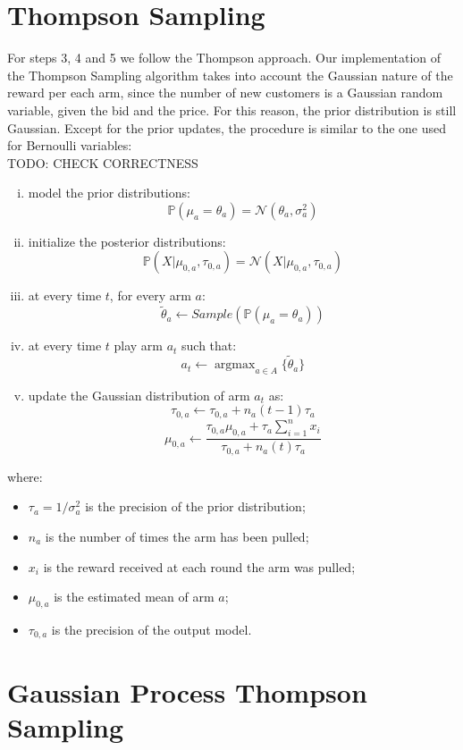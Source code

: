 \documentclass[12pt,a4paper]{report}
\DeclareMathOperator*{\argmax}{argmax}
\begin{document}
		\section{Thompson Sampling}
For steps 3, 4 and 5 we follow the Thompson approach.
Our implementation of the Thompson Sampling algorithm takes into account the Gaussian nature of the reward per each arm, since the number of new customers is a Gaussian random variable, given the bid and the price. For this reason, the prior distribution is still Gaussian. 
Except for the prior updates, the procedure is similar to the one used for Bernoulli variables:
\\TODO: CHECK CORRECTNESS
\begin{enumerate}[i)]
	\item model the prior distributions: $$\mathbb{P}(\mu_a = \theta_a) = \mathcal{N}(\theta_a, \sigma^2_a)$$
	\item initialize the posterior distributions: $$\mathbb{P}(X|\mu_{0,a}, \tau_{0,a}) = \mathcal{N}(X|\mu_{0,a}, \tau_{0,a}) $$
	\item at every time $t$, for every arm $a$:
\[ \tilde \theta_a \leftarrow Sample\left(\mathbb{P}(\mu_a = \theta_a)\right)\]
	\item at every time $t$ play arm $a_t$ such that:
		$$a_t \leftarrow \argmax_{a \in A} \{\tilde \theta_a\} $$
	\item update the Gaussian distribution of arm $a_t$ as:
		$$\tau_{0,a} \leftarrow \tau_{0,a} + n_a(t-1)\tau_a $$
		$$\mu_{0,a} \leftarrow \frac{\tau_{0,a}\mu_{0,a} + \tau_a \sum_{i=1}^{n}{x_i}}{\tau_{0,a} + n_a(t)\tau_a} $$
\end{enumerate}
where:
\begin{itemize}
	\item $\tau_a = 1/\sigma^2_a$ is the precision of the prior distribution;
	\item $n_a$ is the number of times the arm has been pulled;
	\item $x_i$ is the reward received at each round the arm was pulled;
	\item $\mu_{0,a}$ is the estimated mean of arm $a$;
	\item $\tau_{0,a}$ is the precision of the output model.
\end{itemize}		

\section{Gaussian Process Thompson Sampling}
\end{document}
